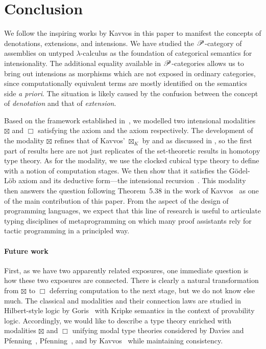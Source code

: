 \documentclass[a4paper,UKenglish,numberwithinsect,cleveref,thm-restate]{lipics-v2021}
\numberwithin{equation}{section}
\theoremstyle{plain}
\begin{document}
\section{Conclusion}\label{sec:conclusion}

We follow the inspiring works by Kavvos in this paper to manifest the concepts of denotations, extensions, and intensions.
We have studied the $\mathscr{P}$-category of assemblies on untyped $\lambda$-calculus as the foundation of categorical semantics for intensionality. 
The additional equality available in $\mathscr{P}$-categories allows us to bring out intensions as morphisms which are not exposed in ordinary categories, since computationally equivalent terms are mostly identified on the semantics side \emph{a priori}.
The situation is likely caused by the confusion between the concept of \emph{denotation} and that of \emph{extension}.

Based on the framework established in~, we modelled two intensional modalities $\boxtimes$ and $\Box$ satisfying the \SFour axiom and the \GL axiom respectively.
The development of the \SFour modality $\boxtimes$ refines that of Kavvos' $\boxtimes_K$ by  and as discussed in , so the first part of results here are not just replicates of the set-theoretic results in homotopy type theory. 
As for the \GL modality, we use the clocked cubical type theory to define with a notion of computation stages.
We then show that it satisfies the Gödel-Löb axiom and its deductive form---the intensional recursion~\cite{Kavvos2017b}.
This \GL modality then answers the question following Theorem~5.38 in the work of Kavvos~\cite{Kavvos2020} as one of the main contribution of this paper.
From the aspect of the design of programming languages, we expect that this line of research is useful to articulate typing disciplines of metaprogramming on which many proof assistants rely for tactic programming in a principled way.

\paragraph*{Future work}
First, as we have two apparently related exposures, one immediate question is how these two exposures are connected.  There is clearly a natural transformation from $\boxtimes$ to $\Box$ deferring computation to the next stage, but we do not know else much.
The classical \SFour and \GL modalities and their connection laws are studied in Hilbert-style logic by Goris~\cite{Goris2009} with Kripke semantics in the context of provability logic.
Accordingly, we would like to describe a type theory enriched with modalities $\boxtimes$ and $\Box$ unifying modal type theories considered by Davies and Pfenning~\cite{Davies2001b}, Pfenning~\cite{Pfenning2002a}, and by Kavvos~\cite{Kavvos2017b,Kavvos2020} while maintaining consistency.
\end{document}
